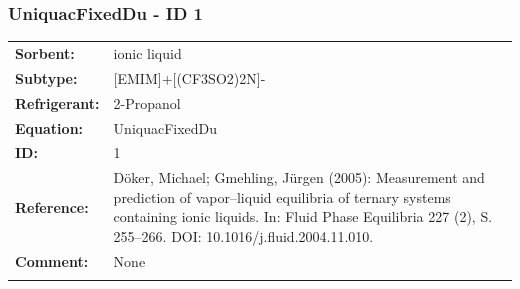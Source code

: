 \subsubsection{UniquacFixedDu - ID 1}
%
\begin{tabular}[l]{|lp{11.5cm}|}
\hline
\addlinespace

\textbf{Sorbent:} & ionic liquid \\
\textbf{Subtype:} & [EMIM]+[(CF3SO2)2N]- \\
\textbf{Refrigerant:} & 2-Propanol \\
\textbf{Equation:} & UniquacFixedDu \\
\textbf{ID:} & 1 \\
\textbf{Reference:} & Döker, Michael; Gmehling, Jürgen (2005): Measurement and prediction of vapor–liquid equilibria of ternary systems containing ionic liquids. In: Fluid Phase Equilibria 227 (2), S. 255–266. DOI: 10.1016/j.fluid.2004.11.010. \\
\textbf{Comment:} & None \\

\addlinespace
\hline
\end{tabular}
\newline

